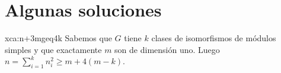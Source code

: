 \chapter*{Algunas soluciones}

\begin{sol}{xca:n+3mgeq4k}
     Sabemos que $G$ tiene $k$ clases de isomorfismos de módulos simples y que exactamente 
     $m$ son de dimensión uno. Luego $n=\sum_{i=1}^kn_i^2\geq m+4(m-k)$. 
\end{sol}

